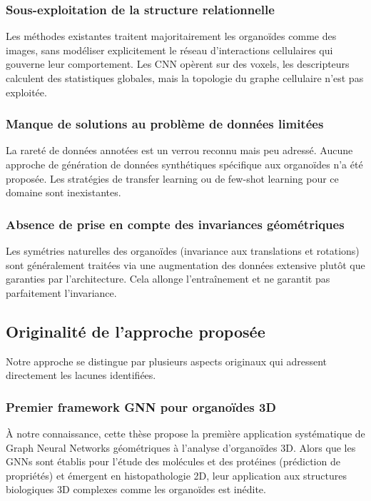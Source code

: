 \subsubsection{Sous-exploitation de la structure relationnelle}

Les méthodes existantes traitent majoritairement les organoïdes comme des images, sans modéliser explicitement le réseau d'interactions cellulaires qui gouverne leur comportement. Les CNN opèrent sur des voxels, les descripteurs calculent des statistiques globales, mais la topologie du graphe cellulaire n'est pas exploitée.

\subsubsection{Manque de solutions au problème de données limitées}

La rareté de données annotées est un verrou reconnu mais peu adressé. Aucune approche de génération de données synthétiques spécifique aux organoïdes n'a été proposée. Les stratégies de transfer learning ou de few-shot learning pour ce domaine sont inexistantes.

\subsubsection{Absence de prise en compte des invariances géométriques}

Les symétries naturelles des organoïdes (invariance aux translations et rotations) sont généralement traitées via une augmentation des données extensive plutôt que garanties par l'architecture. Cela allonge l'entraînement et ne garantit pas parfaitement l'invariance.

\subsection{Originalité de l'approche proposée}

Notre approche se distingue par plusieurs aspects originaux qui adressent directement les lacunes identifiées.

\subsubsection{Premier framework GNN pour organoïdes 3D}

À notre connaissance, cette thèse propose la première application systématique de Graph Neural Networks géométriques à l'analyse d'organoïdes 3D. Alors que les GNNs sont établis pour l'étude des molécules et des protéines (prédiction de propriétés) et émergent en histopathologie 2D, leur application aux structures biologiques 3D complexes comme les organoïdes est inédite.

